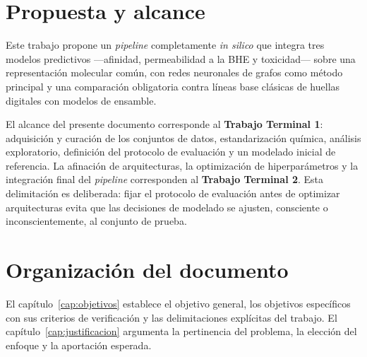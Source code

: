 \section{Propuesta y alcance}
\label{sec:intro-propuesta}
 
Este trabajo propone un \textit{pipeline} completamente \textit{in silico} que
integra tres modelos predictivos —afinidad, permeabilidad a la BHE y
toxicidad— sobre una representación molecular común, con redes neuronales de
grafos como método principal y una comparación obligatoria contra líneas base
clásicas de huellas digitales con modelos de ensamble.
 
El alcance del presente documento corresponde al \textbf{Trabajo Terminal 1}:
adquisición y curación de los conjuntos de datos, estandarización química,
análisis exploratorio, definición del protocolo de evaluación y un modelado
inicial de referencia. La afinación de arquitecturas, la optimización de
hiperparámetros y la integración final del \textit{pipeline} corresponden al
\textbf{Trabajo Terminal 2}. Esta delimitación es deliberada: fijar el protocolo
de evaluación antes de optimizar arquitecturas evita que las decisiones de
modelado se ajusten, consciente o inconscientemente, al conjunto de prueba.
 
\section{Organización del documento}
\label{sec:intro-organizacion}
 
El capítulo~\ref{cap:objetivos} establece el objetivo general, los objetivos
específicos con sus criterios de verificación y las delimitaciones explícitas
del trabajo. El capítulo~\ref{cap:justificacion} argumenta la pertinencia del
problema, la elección del enfoque y la aportación esperada.
 